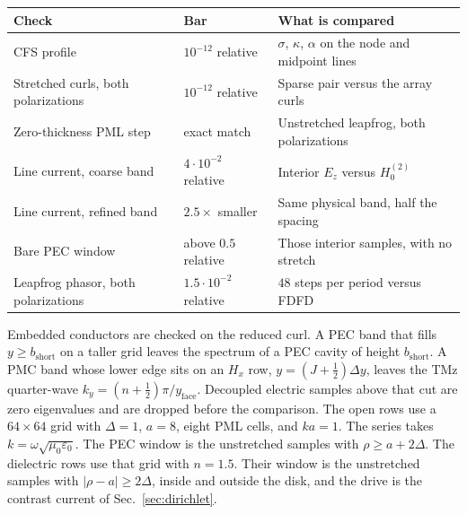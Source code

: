 \documentclass[11pt,a4paper]{article}
\numberwithin{equation}{section}
\begin{document}
\begin{center}
\small
\begin{tabular}{@{}>{\raggedright\arraybackslash}p{5.0cm}>{\raggedright\arraybackslash}p{3.5cm}>{\raggedright\arraybackslash}p{6.2cm}@{}}
\toprule
Check & Bar & What is compared\\
\midrule
CFS profile & $10^{-12}$ relative & $\sigma$, $\kappa$, $\alpha$ on the node and midpoint lines\\
Stretched curls, both polarizations & $10^{-12}$ relative & Sparse pair versus the array curls\\
Zero-thickness PML step & exact match & Unstretched leapfrog, both polarizations\\
Line current, coarse band & $4\cdot 10^{-2}$ relative & Interior $E_z$ versus $H_0^{(2)}$\\
Line current, refined band & $2.5\times$ smaller & Same physical band, half the spacing\\
Bare PEC window & above $0.5$ relative & Those interior samples, with no stretch\\
Leapfrog phasor, both polarizations & $1.5\cdot 10^{-2}$ relative & $48$ steps per period versus FDFD\\
\bottomrule
\end{tabular}
\end{center}

Embedded conductors are checked on the reduced curl. A PEC band that fills
$y\ge b_{\mathrm{short}}$ on a taller grid leaves the spectrum of a PEC
cavity of height $b_{\mathrm{short}}$. A PMC band whose lower edge sits on
an $H_x$ row, $y=(J+\tfrac12)\Delta y$, leaves the TMz quarter-wave
$k_y=(n+\tfrac12)\pi/y_{\mathrm{face}}$. Decoupled electric samples above
that cut are zero eigenvalues and are dropped before the comparison. The
open rows use a $64\times 64$ grid with $\Delta=1$, $a=8$, eight PML
cells, and $ka=1$. The series takes $k=\omega\sqrt{\mu_0\varepsilon_0}$.
The PEC window is the unstretched samples with $\rho\ge a+2\Delta$. The
dielectric rows use that grid with $n=1.5$. Their window is the
unstretched samples with $|\rho-a|\ge 2\Delta$, inside and outside the
disk, and the drive is the contrast current of Sec.~\ref{sec:dirichlet}.
\end{document}
